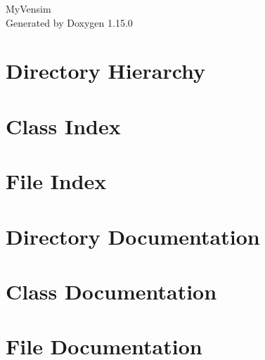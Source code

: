 \documentclass[twoside]{book}
\newcommand{\+}{\discretionary{\mbox{\scriptsize$\hookleftarrow$}}{}{}}
\newcommand{\clearemptydoublepage}{%
    \newpage{\pagestyle{empty}\cleardoublepage}%
  }
\begin{document}
  \raggedbottom
    \hypersetup{pageanchor=false,
                bookmarksnumbered=true,
                pdfencoding=unicode
               }
  \begin{titlepage}
  \vspace*{7cm}
  \begin{center}%
  {\Large My\+Vensim}\\
  \vspace*{1cm}
  {\large Generated by Doxygen 1.15.0}\\
  \end{center}
  \end{titlepage}
  \clearemptydoublepage
  \tableofcontents
  \clearemptydoublepage
  \hypersetup{pageanchor=true}

\chapter{Directory Hierarchy}

\chapter{Class Index}

\chapter{File Index}

\chapter{Directory Documentation}





\chapter{Class Documentation}



\chapter{File Documentation}



















  \backmatter
  \newpage
  \clearemptydoublepage
  \printindex
\end{document}
